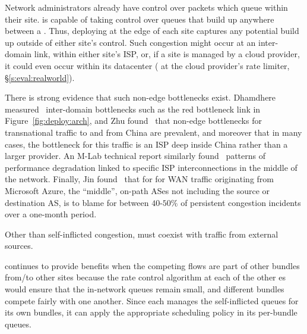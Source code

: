 Network administrators already have control over packets which queue within their site. \name is capable of taking control over queues that build up anywhere between a \pair. Thus, deploying \name at the edge of each site captures any potential build up outside of either site's control. Such congestion might occur at an inter-domain link, within either site's ISP, or, if a site is managed by a cloud provider, it could even occur within its datacenter (\eg{} at the cloud provider's rate limiter, \S\ref{s:eval:realworld}). 

There is strong evidence that such non-edge bottlenecks exist.
Dhamdhere \etal measured~\cite{inferring-interdomain-congestion} inter-domain bottlenecks such as the red bottleneck link in Figure~\ref{fig:deploy:arch}, and
Zhu \etal found~\cite{bottleneck-of-china} that non-edge bottlenecks for transnational traffic to and from China are prevalent, and moreover that in many cases, the bottleneck for this traffic is an ISP deep inside China rather than a larger provider.
An M-Lab technical report similarly found~\cite{mlab-tr} patterns of performance degradation linked to specific ISP interconnections in the middle of the network.
Finally, Jin \etal found~\cite{blameit} that for for WAN traffic originating from Microsoft Azure, the ``middle'', \ie on-path ASes not including the source or destination AS, is to blame for between $40$-$50\%$ of persistent congestion incidents over a one-month period. 

 Other than self-inflicted congestion, \name must coexist with traffic from external sources.

\vspace{2pt}
\name continues to provide benefits when the competing flows are part of other bundles from/to other sites because the rate control algorithm at each of the other {\inbox}es would ensure that the in-network queues remain small, and different bundles compete fairly with one another. Since each \inbox manages the self-inflicted queues for its own bundles, it can apply the appropriate scheduling policy in its per-bundle queues.

